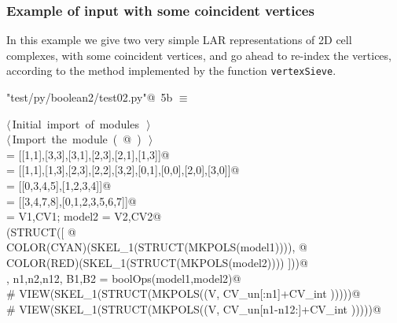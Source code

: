 \documentclass[11pt,oneside]{article}	%
\begin{document}
\subsubsection{Example of input with some coincident vertices}
In this example we give two very simple LAR representations of 2D cell complexes, with some coincident vertices, and go ahead to re-index the vertices, according to the method implemented by the function \texttt{vertexSieve}.

\begin{flushleft} \small
\begin{minipage}{\linewidth} \label{scrap8}
\protect{}\verb@"test/py/boolean2/test02.py"@\nobreak\ {\footnotesize 5b }$\equiv$
\vspace{-1ex}
\begin{list}{}{} \item
\mbox{}\verb@@\hbox{$\langle\,$Initial import of modules\nobreak\ {\footnotesize {}}$\,\rangle$}\verb@@\\
\mbox{}\verb@@\hbox{$\langle\,$Import the module\nobreak\ ({\footnotesize {}\label{scrap9}
 }\mbox{}@ ) {\footnotesize {}}$\,\rangle$}\verb@@\\
\mbox{} = [[1,1],[3,3],[3,1],[2,3],[2,1],[1,3]]@\\
\mbox{} = [[1,1],[1,3],[2,3],[2,2],[3,2],[0,1],[0,0],[2,0],[3,0]]@\\
\mbox{} = [[0,3,4,5],[1,2,3,4]]@\\
\mbox{} = [[3,4,7,8],[0,1,2,3,5,6,7]]@\\
\mbox{} = V1,CV1; model2 = V2,CV2@\\
\mbox{}\verb@VIEW(STRUCT([ @\\
\mbox{}\verb@   COLOR(CYAN)(SKEL_1(STRUCT(MKPOLS(model1)))), @\\
\mbox{}\verb@   COLOR(RED)(SKEL_1(STRUCT(MKPOLS(model2)))) ]))@\\
\mbox{}\verb@V, n1,n2,n12, B1,B2 = boolOps(model1,model2)@\\
\mbox{}\verb@# VIEW(SKEL_1(STRUCT(MKPOLS((V, CV_un[:n1]+CV_int )))))@\\
\mbox{}\verb@# VIEW(SKEL_1(STRUCT(MKPOLS((V, CV_un[n1-n12:]+CV_int )))))@\\
\mbox{}\verb@@{\NWsep}
\end{list}
\vspace{-2ex}
\end{minipage}\\[4ex]
\end{flushleft}
\end{document}

